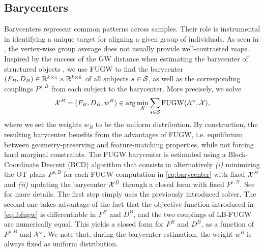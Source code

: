 \subsection{Barycenters}
Barycenters represent common patterns across samples.
Their role is instrumental in identifying a unique target for aligning a given group of individuals.
As seen in , the vertex-wise group average does not usually provide
well-contrasted maps.
Inspired by the success of the GW distance when estimating the barycenter of structured objects
\citep{Peyre16,Vayer19b}, we use FUGW to find the barycenter
$(F_B, D_B) \in \mathbb R^{k \times c} \times \mathbb R^{k \times k}$
of all subjects $s \in \mathcal S$, as well as the corresponding couplings $P^{s,B}$ from each subject
to the barycenter. More precisely, we solve
\begin{equation}
    \label{eq:barycenter}
    \mathcal X^B = (F_B, D_B, w^B) \in \arg\min_{\mathcal X}  \sum_{s \in \mathcal S} \text{FUGW}(\mathcal X^s, \mathcal X),
\end{equation}
where we set the weights $w_B$ to be the uniform distribution.
By construction, the resulting barycenter benefits from the advantages of FUGW,
i.e. equilibrium between geometry-preserving and feature-matching properties,
while not forcing hard marginal constraints. The FUGW barycenter is estimated
using a Block-Coordinate Descent (BCD) algorithm that consists in alternatively
\textit{(i)} minimizing the OT plans $P^{s,B}$ for each FUGW computation
in \eqref{eq:barycenter} with fixed $\mathcal X^B$ and \textit{(ii)}
updating the barycenter $\mathcal X^B$ through a closed form with fixed $P^{s,B}$.
See  for more details.
The first step simply uses the previously introduced solver.
The second one takes advantage of the fact that the objective function introduced
in \eqref{eq:lbfugw} is differentiable in $F^B$ and $D^B$, and the two couplings of
LB-FUGW are numerically equal. This yields a closed form for $F^B$ and $D^B$,
as a function of $P^{s,B}$ and $\mathcal X^s$. We note that, during the barycenter estimation,
the weight $w^B$ is always fixed as uniform distribution.

